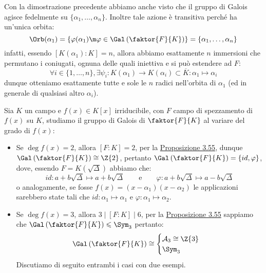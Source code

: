\documentclass[11pt]{scrartcl}
\begin{document}
\begin{remark}
Con la dimostrazione precedente abbiamo anche visto che il gruppo di Galois agisce fedelmente su $\{\alpha_1,\ldots,\alpha_n\}$. Inoltre tale azione è transitiva perché ha un'unica orbita:
\[ \Orb(\alpha_1) = \left\{\varphi(\alpha_1) \m \varphi \in \Gal\left(\faktor{F}{K}\right)\right\} = \{\alpha_1,\ldots,\alpha_n\}
    \]
infatti, essendo $[K(\alpha_1) : K] = n$, allora abbiamo esattamente $n$ immersioni che permutano i coniugati, ognuna delle quali iniettiva e si può estendere ad $F$:
\[ \forall i \in \{1,\ldots,n\},  \exists \psi_i : K(\alpha_1) \longrightarrow K(\alpha_i) \subset \overline K : \alpha_1 \longmapsto \alpha_i
    \]
dunque otteniamo esattamente tutte e sole le $n$ radici nell'orbita di $\alpha_1$ (ed in generale di qualsiasi altro $\alpha_i$).
\end{remark}

\begin{example}
    Sia $K$ un campo e $f(x) \in K[x]$ irriducibile, con $F$ campo di spezzamento di $f(x)$ su $K$, studiamo il gruppo di Galois di $\faktor{F}{K}$ al variare del grado di $f(x)$:
    \begin{itemize}
        \item Se $\deg f(x) = 2$, allora $[F : K] = 2$, per la \hyperref[3.55]{Proposizione 3.55}, dunque $\Gal\left(\faktor{F}{K}\right) \cong \Z{2}$, pertanto $\Gal\left(\faktor{F}{K}\right) = \{id,\varphi\}$, dove, essendo $F = K(\sqrt{\Delta})$ abbiamo che:
        \[ id : a+b\sqrt{\Delta} \longmapsto a+b\sqrt{\Delta} \qquad \text{e} \qquad \varphi : a+b\sqrt{\Delta} \longmapsto a-b\sqrt{\Delta}
            \]
        o analogamente, se fosse $f(x) = (x - \alpha_1)(x - \alpha_2 )$ le applicazioni sarebbero state tali che $id : \alpha_1 \longmapsto \alpha_1$ e $\varphi : \alpha_1 \longmapsto \alpha_2$.
        \item Se $\deg f(x) = 3$, allora $3 \mid [F : K] \mid 6$, per la \hyperref[3.55]{Proposizione 3.55} sappiamo che $\Gal\left(\faktor{F}{K}\right) \leqslant \Sym_3$ pertanto:
        \[ \Gal\left(\faktor{F}{K}\right) \cong \begin{cases}
            \mathcal{A}_3 \cong \Z{3} \\
            \Sym_3
        \end{cases}
            \]
        Discutiamo di seguito entrambi i casi con due esempi.
    \end{itemize}
\end{example}
\end{document}
